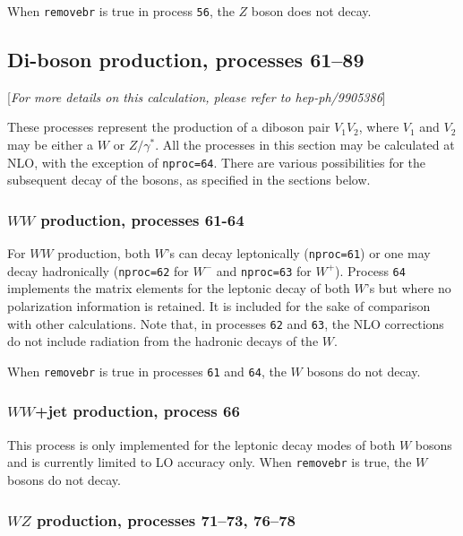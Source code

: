 \documentclass[12pt]{article}
\begin{document}
When {\tt removebr} is true in process {\tt 56}, the $Z$ boson does not decay.

\subsection{Di-boson production, processes 61--89}
\label{subsec:diboson}

\begin{center}
[{\it For more details on this calculation, please refer to hep-ph/9905386}]
\end{center}

These processes represent the production of a diboson pair $V_1 V_2$,
where $V_1$ and $V_2$ may be either a $W$ or $Z/\gamma^*$. 
All the processes in this section may be calculated at NLO, with the exception
of {\tt nproc=64}. There are various
possibilities for the subsequent decay of the bosons, as specified in the
sections below.

\subsubsection{$WW$ production, processes 61-64}

For $WW$ production, both $W$'s can decay leptonically ({\tt nproc=61}) or one
may decay hadronically ({\tt nproc=62} for $W^-$ and {\tt nproc=63} for $W^+$).
Process {\tt 64} implements the matrix elements for the leptonic decay of
both $W$'s but where no polarization information is retained. It is included
for the sake of comparison with other calculations. Note that, in processes
{\tt 62} and {\tt 63}, the NLO corrections do not include radiation from the
hadronic decays of the $W$.

When {\tt removebr} is true in processes {\tt 61} and {\tt 64},
the $W$ bosons do not decay.

\subsubsection{$WW$+jet production, process 66}

This process is only implemented for the leptonic decay modes of both $W$
bosons and is currently limited to LO accuracy only. When {\tt removebr} is true,
the $W$ bosons do not decay.

\subsubsection{$WZ$ production, processes 71--73, 76--78}
\end{document}
